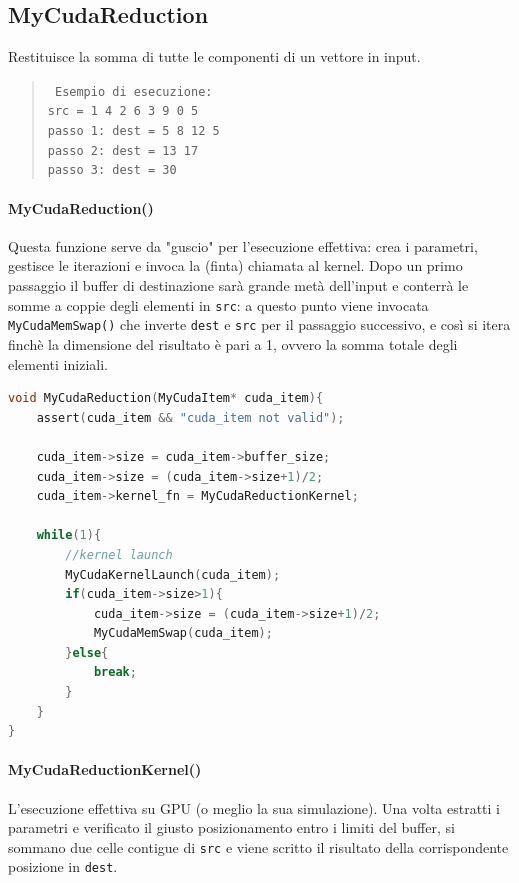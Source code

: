 \documentclass[binding=0.6cm, noexaminfo]{sapthesis}\usepackage{microtype}
\begin{document}
\subsection{MyCudaReduction}
Restituisce la somma di tutte le componenti di un vettore in input.
\begin{quote}\texttt{
    Esempio di esecuzione: \\
    src = 1 4 2 6 3 9 0 5\\
    passo 1: dest = 5 8 12 5\\ 
    passo 2: dest = 13 17 \\
    passo 3: dest = 30 \\
}
\end{quote} 

\paragraph{MyCudaReduction()}
Questa funzione serve da "guscio" per l'esecuzione effettiva: crea i parametri,
gestisce le iterazioni e invoca la (finta) chiamata al kernel. Dopo un primo passaggio il buffer di destinazione 
sarà grande metà dell'input e conterrà le somme a coppie degli elementi in \texttt{src}:
 a questo punto viene invocata \texttt{MyCudaMemSwap()} che inverte \texttt{dest}
e \texttt{src} per il passaggio successivo, e così si itera finchè la dimensione del risultato è pari a 1,
ovvero la somma totale degli elementi iniziali. 

\begin{lstlisting}[language=C]
void MyCudaReduction(MyCudaItem* cuda_item){
    assert(cuda_item && "cuda_item not valid");
 
    cuda_item->size = cuda_item->buffer_size;
    cuda_item->size = (cuda_item->size+1)/2;
    cuda_item->kernel_fn = MyCudaReductionKernel;

    while(1){
        //kernel launch 
        MyCudaKernelLaunch(cuda_item);
        if(cuda_item->size>1){
            cuda_item->size = (cuda_item->size+1)/2;
            MyCudaMemSwap(cuda_item);
        }else{
            break;
        }
    }
}
\end{lstlisting}

\paragraph{MyCudaReductionKernel()}
L'esecuzione effettiva su GPU (o meglio la sua simulazione). Una volta estratti i parametri e verificato il 
giusto posizionamento entro i limiti del buffer, si sommano due celle contigue di \texttt{src} e viene scritto il risultato della corrispondente posizione in \texttt{dest}. 
\end{document}
